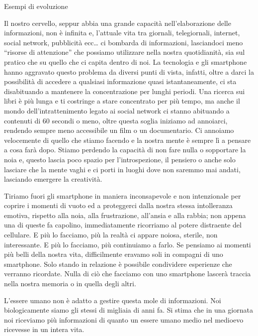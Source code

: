 \documentclass[12pt]{book} %
\begin{document}
\begin{mdframed}[linewidth=1pt]
Esempi di evoluzione

Il nostro cervello, seppur abbia una grande capacità nell'elaborazione delle informazioni, non è
infinita e, l'attuale vita tra giornali, telegiornali, internet, social network, pubblicità ecc…
ci bombarda di informazioni, lasciandoci meno “risorse di attenzione” che possiamo utilizzare nella nostra
quotidianità, sia sul pratico che su quello che ci capita dentro di noi. La tecnologia e gli smartphone hanno aggravato
questo problema da diversi punti di vista, infatti, oltre a darci la possibilità di accedere a qualsiasi informazione
quasi istantaneamente, ci sta disabituando a mantenere la concentrazione per lunghi periodi. Una ricerca sui libri è
più lunga e ti costringe a stare concentrato per più tempo, ma anche il mondo dell'intrattenimento
legato ai social network ci stanno abituando a contenuti di 60 secondi o meno, oltre questa soglia iniziamo ad
annoiarci, rendendo sempre meno accessibile un film o un documentario. Ci annoiamo velocemente di quello che stiamo
facendo e la nostra mente è sempre lì a pensare a cosa farà dopo. Stiamo perdendo la capacità di non fare nulla o
sopportare la noia e, questo lascia poco spazio per l'introspezione, il pensiero o anche solo
lasciare che la mente vaghi e ci porti in luoghi dove non saremmo mai andati, lasciando emergere la creatività.

Tiriamo fuori gli smartphone in maniera inconsapevole e non intenzionale per coprire i momenti di vuoto ed a proteggerci
dalla nostra stessa intolleranza emotiva, rispetto alla noia, alla frustrazione, all'ansia e alla
rabbia; non appena una di queste fa capolino, immediatamente ricorriamo al potere distraente del cellulare. E più lo
facciamo, più la realtà ci appare noiosa, sterile, non interessante. E più lo facciamo, più continuiamo a farlo. Se
pensiamo ai momenti più belli della nostra vita, difficilmente eravamo soli in compagni di uno smartphone. Solo stando
in relazione è possibile condividere esperienze che verranno ricordate. Nulla di ciò che facciamo con uno smartphone
lascerà traccia nella nostra memoria o in quella degli altri. 

L'essere umano non è adatto a gestire questa mole di informazioni. Noi biologicamente siamo gli
stessi di migliaia di anni fa. Si stima che in una giornata noi riceviamo più informazioni di quanto un essere umano
medio nel medioevo ricevesse in un intera vita. 


\end{mdframed}
\end{document}
